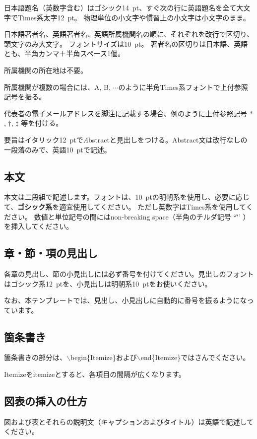 \documentclass{PASJ2024}
\begin{document}
\begin{Itemize}
\item 日本語題名（英数字含む）はゴシック14~pt、すぐ次の行に英語題名を全て大文字でTimes系太字12~pt。
物理単位の小文字や慣習上の小文字は小文字のまま。
%
\item 日本語著者名、英語著者名、英語所属機関名の順に、それぞれを改行で区切り、頭文字のみ大文字。
フォントサイズは10~pt。
著者名の区切りは日本語、英語とも、半角カンマ＋半角スペース1個。
%
\item 所属機関の所在地は不要。
%
\item 所属機関が複数の場合には、A, B, $\cdots$のように半角Times系フォントで上付参照記号を振る。
%
\item 代表者の電子メールアドレスを脚注に記載する場合、例のように上付参照記号 $*$, $\dagger$, $\ddagger$ 等を付ける。
%
\item 要旨はイタリック12~ptで{\textit Abstract}と見出しをつける。Abstract文は改行なしの一段落のみで、英語10~ptで記述。
%
\end{Itemize}
%
\subsection{本文}

本文は二段組で記述します。フォントは、10~ptの明朝系を使用し、必要に応じて、{\textbf{ゴシック系}}を適宜使用してください。
ただし英数字はTimes系を使用してください。
数値と単位記号の間にはnon-breaking space（半角のチルダ記号 ``\~'' ）を挿入してください。
%
\subsection{章・節・項の見出し}
各章の見出し、節の小見出しには必ず番号を付けてください。見出しのフォントはゴシック系12~ptを、小見出しは明朝系10~ptをお使いください。

なお、本テンプレートでは、見出し、小見出しに自動的に番号を振るようになっています。
%
\subsection{箇条書き}
箇条書きの部分は、$\backslash$begin\{Itemize\}および$\backslash$end\{Itemize\}ではさんでください。

Itemizeをitemizeとすると、各項目の間隔が広くなります。
%
\subsection{図表の挿入の仕方}
図および表とそれらの説明文（キャプションおよびタイトル）は英語で記述してください。
\end{document}
